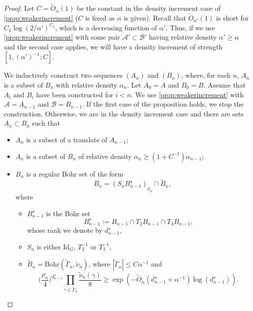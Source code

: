 \documentclass{daj}
\theoremstyle{definition}
\newcommand{\A}{\ensuremath{\mathcal{A}}}
\newcommand{\B}{\ensuremath{\mathcal{B}}}
\begin{document}
\begin{proof}
Let $C = \tilde{O}_{\alpha}(1)$ be the constant in the density increment case of \cref{prop:weakerincrement} ($C$ is fixed as $\alpha$ is given). Recall that $\tilde{O}_{\alpha'}(1)$ is short for $C_1 \log(2/\alpha')^{C_2}$, which is a decreasing function of $\alpha'$. Thus, if we use \cref{prop:weakerincrement} with some pair $\A' \subset \B'$ having relative density $\alpha' \geq \alpha$ and the second case applies, we will have a density increment of strength $[1, (\alpha')^{-1}; C]$.

We inductively construct two sequences $(A_n)$ and $(B_n)$, where, for each $n$, $A_n$ is a subset of $B_n$ with relative density $\alpha_n$. Let $A_0 = A$ and $B_0 = B$. Assume that $A_i$ and $B_i$ have been constructed for $i<n$. We use \cref{prop:weakerincrement} with $\A = A_{n-1}$ and $\B = B_{n-1}$. If the first case of the proposition holds, we stop the construction. Otherwise, we are in the density increment case and there are sets $A_n \subset B_n$ such that
\begin{itemize}
	\item $A_{n}$ is a subset of a translate of $A_{n-1}$;
	\item $A_n$ is a subset of $B_n$ of relative density $\alpha_n \geq (1+C^{-1})\alpha_{n-1}$;
	\item $B_n$ is a regular Bohr set of the form 
	\begin{equation}
		\label{eq:inters1weaker}
		B_n = (S_n B_{n-1}^{\star})_{\rho_n} \cap \widetilde{B}_{n},
	\end{equation}
	where 
	\begin{itemize}
		\item $B_{n-1}^{\star}$ is the Bohr set
		\begin{equation}
		\label{eq:inters2weaker}
		B_{n-1}^{\star}:= B_{n-1} \cap T_2 B_{n-1}\cap T_3 B_{n-1},
		\end{equation}
		whose rank we denote by $d_{n-1}^{\star}$,
		\item $S_n$ is either $\mathrm{Id}_G$, $T_2^{-1}$ or $T_3^{-1}$,
		\item $\widetilde{B}_n = \mathrm{Bohr}(\widetilde{\Gamma}_n, \widetilde{\nu}_n)$, where $|\widetilde{\Gamma}_{n}| \leq C\alpha^{-1}$ and 
	\begin{equation}
	\label{eq:boundwidthweaker}
	\bigg(\frac{\rho_n}{4}\bigg)^{d_{n-1}^{\star}}\prod_{\gamma \in \widetilde{\Gamma}_n} \frac{\widetilde{\nu}_n(\gamma)}{8} \geq  \exp \left(-\tilde{O}_{\alpha} \left(d_{n-1}^{\star}+\alpha^{-1}\right) \log\left(d_{n-1}^{\star}\right)\right).
	\end{equation}
	\end{itemize}
\end{itemize}


\end{proof}
\end{document}
